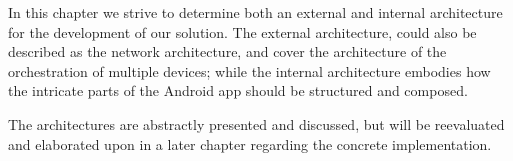 In this chapter we strive to determine both an external and internal architecture for the development of our solution.
The external architecture, could also be described as the network architecture, and cover the architecture of the orchestration of multiple devices;
while the internal architecture embodies how the intricate parts of the Android app should be structured and composed.

The architectures are abstractly presented and discussed, but will be reevaluated and elaborated upon in a later chapter regarding the concrete implementation.
